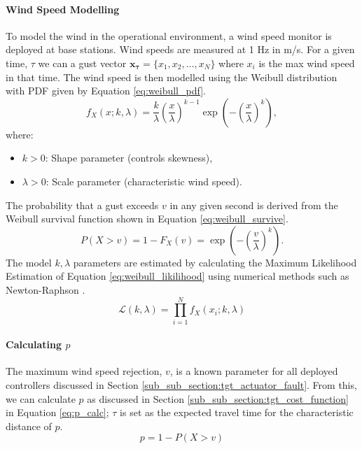 \paragraph{Wind Speed Modelling}
To model the wind in the operational environment, a wind speed monitor is deployed at base stations. Wind speeds are measured at 1 Hz in m/s. For a given time, $\tau$ we can a gust vector $\mathbf{x_{\tau}} =  \{x_1, x_2, \dots, x_N\}$ where $x_i$ is the max wind speed in that time. The wind speed is then modelled using the Weibull distribution \cite{weibull1951} with PDF given by Equation \ref{eq:weibull_pdf}.
\begin{equation}\label{eq:weibull_pdf}
    f_X(x; k, \lambda) = \frac{k}{\lambda} \left(\frac{x}{\lambda}\right)^{k-1} \exp\left(-\left(\frac{x}{\lambda}\right)^k\right),
\end{equation}
where:
\begin{itemize}
    \item \( k > 0 \): Shape parameter (controls skewness),
    \item \( \lambda > 0 \): Scale parameter (characteristic wind speed).
\end{itemize}
The probability that a gust exceeds \( v \) in any given second is derived from the Weibull survival function shown in Equation \ref{eq:weibull_survive}.
\begin{equation}\label{eq:weibull_survive}
    P(X > v) = 1 - F_X(v) = \exp\left(-\left(\frac{v}{\lambda}\right)^k\right).
\end{equation}
The model $k, \lambda$ parameters are estimated by calculating the Maximum Likelihood Estimation of Equation \ref{eq:weibull_likilihood} using numerical methods such as Newton-Raphson \cite{rinne2008}.
\begin{equation}\label{eq:weibull_likilihood}
     \mathcal{L}(k, \lambda) = \prod_{i=1}^N f_X(x_i; k, \lambda)
\end{equation}
\paragraph{Calculating $p$}
The maximum wind speed rejection, $v$, is a known parameter for all deployed controllers discussed in Section \ref{sub_sub_section:tgt_actuator_fault}. From this, we can calculate $p$ as discussed in Section \ref{sub_sub_section:tgt_cost_function} in Equation \ref{eq:p_calc}; $\tau$ is set as the expected travel time for the characteristic distance of $p$.
\begin{equation}\label{eq:p_calc}
    p = 1-P(X>v)
\end{equation}
